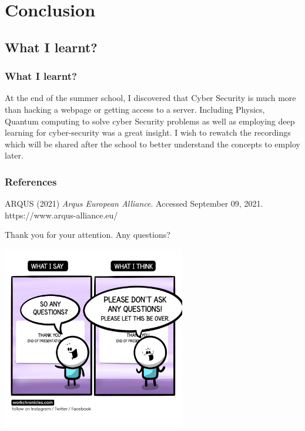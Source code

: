 \documentclass{beamer}
\begin{document}
\section{Conclusion}
\subsection{What I learnt?}
\begin{frame}
    \frametitle{What I learnt?}
At the end of the summer school, I discovered that Cyber Security is much more than hacking a webpage or getting access to a server. Including Physics, Quantum computing to solve cyber Security
problems as well as employing deep learning for cyber-security was a great insight. I wish to rewatch the recordings which will be shared after the school to better understand the concepts
to employ later.
\end{frame}
\begin{frame}
    \frametitle{References}
    \footnotesize{
    \begin{thebibliography}{99}


     ARQUS (2021)
    \newblock \emph{Arqus European Alliance}. Accessed September 09, 2021. https://www.arqus-alliance.eu/
    


    \end{thebibliography}
    }
\end{frame}



\begin{frame}
{\centerline{Thank you for your attention. Any questions?}}
\begin{center}
\includegraphics[width=0.6\textwidth]{images/questions.png}
\end{center}
\end{frame}

\end{document}
